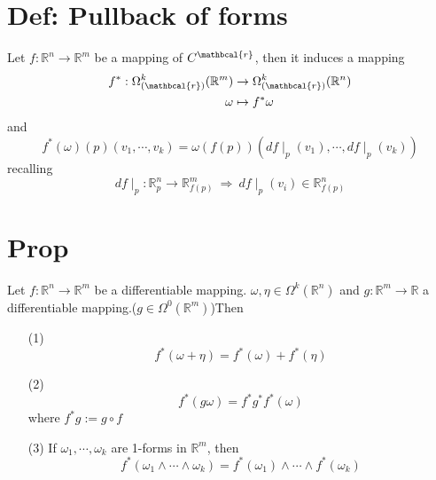 \documentclass{book}
\begin{document}
\section{Def: Pullback of forms}
Let $f:\mathbb{R}^n\rightarrow \mathbb{R}^m$ be a mapping of $C^\mathbcal{r}$, then it induces a mapping 
$$\begin{aligned}
    f^*:\Omega^k_{(\mathbcal{r})}(\mathbb{R}^m)&\rightarrow\Omega^k_{(\mathbcal{r})}(\mathbb{R}^n)\\\omega&\mapsto f^*\omega
\end{aligned}$$
and $$f^*(\omega)(p)(v_1,\cdots,v_k)=\omega(f(p))(df\mid_p(v_1),\cdots,df\mid_p(v_k))$$
recalling$$df\mid_p:\mathbb{R}^n_p\rightarrow\mathbb{R}^m_{f(p)}\ \Rightarrow\ df\mid_p(v_i)\in \mathbb{R}^n_{f(p)}$$
\section{Prop}
Let $f:\mathbb{R}^n\rightarrow \mathbb{R}^m$ be a differentiable mapping. $\omega,\eta\in \Omega^k(\mathbb{R}^n)$ and $g:\mathbb{R}^m\rightarrow\mathbb{R}$ a differentiable mapping.($g\in \Omega^0(\mathbb{R}^m)$)Then
\begin{itemize}
    \item[(1)] $$f^*(\omega+\eta)=f^*(\omega)+ f^*(\eta)$$
    \item[(2)] $$f^*(g\omega)=f^*g^*f^*(\omega)$$where $f^*g:=g\circ f$
    \item[(3)] If $\omega_1,\cdots,\omega_k$ are 1-forms in $\mathbb{R}^m$, then $$f^*(\omega_1\wedge\cdots\wedge\omega_k)=f^*(\omega_1)\wedge\cdots\wedge f^*(\omega_k)$$
\end{itemize}
\end{document}

